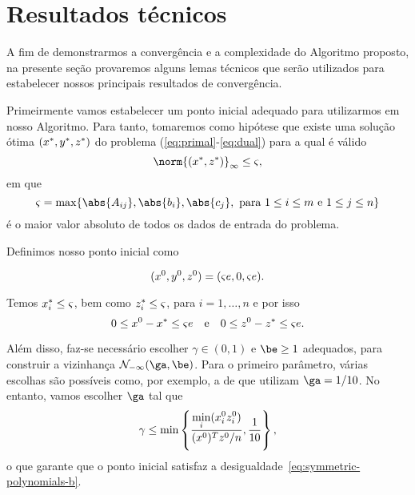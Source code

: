 

\section{Resultados técnicos}



A fim de demonstrarmos a convergência e a complexidade do Algoritmo proposto, na presente seção provaremos alguns lemas técnicos que serão utilizados para estabelecer nossos principais resultados de convergência.



Primeirmente vamos  estabelecer um ponto inicial adequado para utilizarmos em nosso Algoritmo. Para tanto, tomaremos como hipótese que existe uma solução ótima $(x^*,y^*,z^*)$  do problema (\ref{eq:primal}-\ref{eq:dual}) para a qual é válido  
\begin{equation}
	\label{eq:norm-xz-star}
	\norm{(\xstar,\zstar)}_{\infty} \leq \bdxzstar,
\end{equation}
em que 
 \[
 	\bdxzstar = \max\{\abs{A_{ij}},\abs{b_{i}},\abs{c_{j}}, \text{ para } 1\leq i\leq m \text{ e } 1\leq j \leq n  \}
 \]
é o maior valor absoluto de todos os dados de entrada do problema. 

Definimos nosso ponto inicial como

\begin{equation}
	\label{eq:initial-point}
	(x^0 ,y^0,z^0 ) = (\varsigma e, 0, \varsigma e ).
\end{equation}

Temos $x^*_{i}\leq   \varsigma$, bem como $z^*_{i}\leq \varsigma $, para $i=1,\ldots,n$ e por isso
\begin{equation}
	\label{eq:x0}
0\leq x^{0} - x^* \leq \varsigma e \quad \text{e} \quad 0\leq z^0  - z^* \leq \varsigma e. 
\end{equation}


Além disso, faz-se necessário  escolher  $\gamma\in(0,1)$  e $\be\geq 1$ adequados, para construir a vizinhança $\Nset_{-\infty}(\ga,\be)$. Para o primeiro parâmetro, várias escolhas são possíveis como, por exemplo, a de 
\textcite{Colombo:2008ia} que utilizam $\ga = 1/10$. No entanto, vamos escolher $\ga$ tal que  
\[
\gamma \leq  \min\left\{ \frac{\displaystyle \min_{i}(x^0_{i} z^0_{i} )}{(x^0 )^Tz^0 /n}, \frac{1}{10}\right\},
\]
o que garante que o ponto inicial satisfaz a desigualdade~\eqref{eq:symmetric-polynomials-b}.

